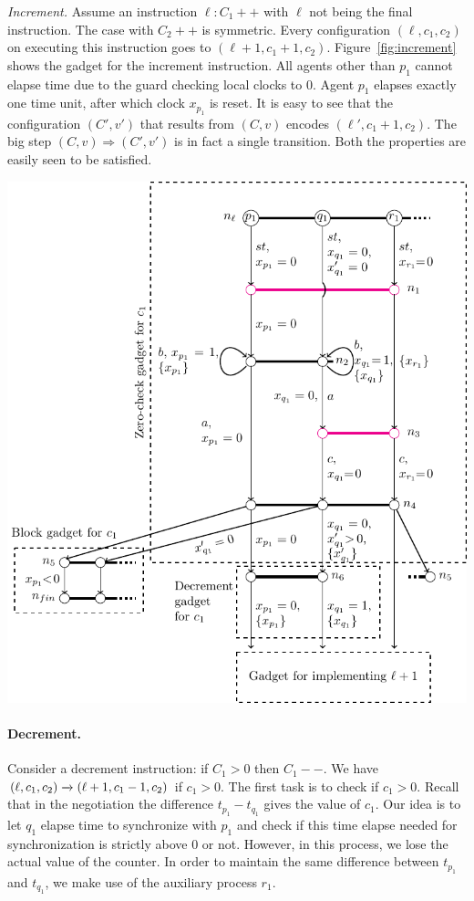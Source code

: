 \noindent \emph{Increment.} Assume an instruction $\ell: C_1 ++$ with $\ell$ not being the final instruction. The case with $C_2++$ is symmetric. Every configuration $(\ell, c_1, c_2)$ on executing this instruction goes to $(\ell + 1, c_1 + 1, c_2)$. Figure~\ref{fig:increment} shows the gadget for the increment instruction. All agents other than $p_1$ cannot elapse time due to the guard checking local clocks to $0$. Agent $p_1$ elapses
exactly one time unit, after which clock $x_{p_1}$ is reset.
It is easy to see that the configuration $(C', v')$ that results from $(C, v)$
encodes $(\ell', c_1 + 1, c_2)$. The big step $(C, v) \Rightarrow (C',v')$ is in fact a single transition. Both the properties are easily seen to be satisfied. 

\includegraphics{decrement-gadget.pdf}

\paragraph*{Decrement.} Consider a decrement instruction: if $C_1 > 0$
then $C_1 --$. We have
$(\ell, c_1, c_2) \xrightarrow{} (\ell+1, c_1 - 1, c_2)$ if $c_1 > 0$. The
first task is to check if $c_1 > 0$. Recall that in the negotiation the difference $t_{p_1} - t_{q_1}$ gives the value of $c_1$. Our idea is to let $q_1$ elapse time to
synchronize with $p_1$ and check if this time elapse needed for
synchronization is strictly above $0$ or not. However, in this
process, we lose the actual value of the counter. In order to maintain the same difference between $t_{p_1}$ and $t_{q_1}$, we make use of the auxiliary process $r_1$.

